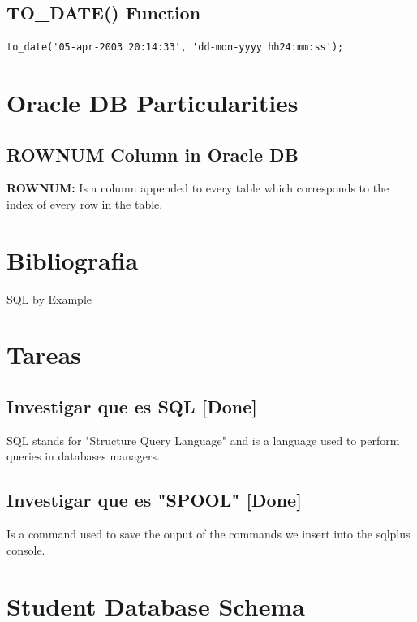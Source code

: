 \documentclass[twoside]{article}
\begin{document}
\subsection{TO\_DATE() Function}
\begin{verbatim}
to_date('05-apr-2003 20:14:33', 'dd-mon-yyyy hh24:mm:ss');
\end{verbatim}

\section{Oracle DB Particularities}

\subsection{ROWNUM Column in Oracle DB}
\textbf{ROWNUM: } Is a column appended to every table which corresponds to the index of every row in the table.

\section{Bibliografia}

SQL by Example

\section{Tareas}
\subsection{Investigar que es SQL [Done]}
SQL stands for "Structure Query Language" and is a language used to perform queries in databases managers.
\subsection{Investigar que es "SPOOL" [Done]}
Is a command used to save the ouput of the commands we insert into the sqlplus console.
\section{Student Database Schema}

\end{document}

